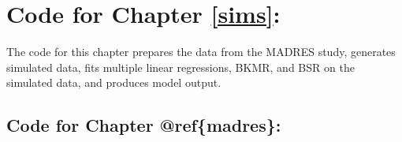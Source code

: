 \documentclass[12pt, twoside]{amherstthesis}
\begin{document}
\hypertarget{code-for-chapter-refsims}{%
\section{Code for Chapter \ref{sims}:}\label{code-for-chapter-refsims}}

The code for this chapter prepares the data from the MADRES study, generates simulated data, fits multiple linear regressions, BKMR, and BSR on the simulated data, and produces model output.

\hypertarget{code-for-chapter-refmadres}{%
\subsection{Code for Chapter @ref\{madres\}:}\label{code-for-chapter-refmadres}}
\end{document}
